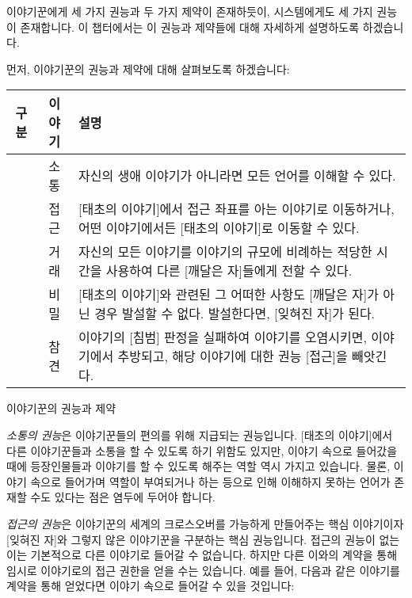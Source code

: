 \documentclass{report}
\begin{document}
	이야기꾼에게 세 가지 권능과 두 가지 제약이 존재하듯이, 시스템에게도 세 가지 권능이 존재합니다. 이 챕터에서는 이 권능과 제약들에 대해 자세하게 설명하도록 하겠습니다.
	
	\bigskip
	
	먼저, 이야기꾼의 권능과 제약에 대해 살펴보도록 하겠습니다:
	
	\smallskip
	
	\begin{minipage}{\textwidth}
		\begin{tabularx}{\textwidth}{c|c|X}
			\hline
			\textbf{구분} & \textbf{이야기} & \textbf{설명} \\ \hline \hline
			[권능] & 소통\index{소통} & 자신의 생애 이야기가 아니라면 모든 언어를 이해할 수 있다. \\ \hline
			[권능] & 접근\index{접근} & [태초의 이야기]에서 접근 좌표를 아는 이야기로 이동하거나, 어떤 이야기에서든 [태초의 이야기]로 이동할 수 있다. \\ \hline
			[권능] & 거래\index{거래} & 자신의 모든 이야기를 이야기의 규모에 비례하는 적당한 시간을 사용하여 다른 [깨달은 자]들에게 전할 수 있다. \\ \hline
			[제약] & 비밀\index{비밀} & [태초의 이야기]와 관련된 그 어떠한 사항도 [깨달은 자]가 아닌 경우 발설할 수 없다. 발설한다면, [잊혀진 자]가 된다. \\ \hline
			[제약] & 참견\index{참견} & 이야기의 [침범] 판정을 실패하여 이야기를 오염시키면, 이야기에서 추방되고, 해당 이야기에 대한 권능 [접근]을 빼앗긴다. \\\hline
		\end{tabularx}
		\begin{center}
			이야기꾼의 권능과 제약
		\end{center}
	\end{minipage}
	
	\bigskip
	
	\emph{소통의 권능}은 이야기꾼들의 편의를 위해 지급되는 권능입니다. [태초의 이야기]에서 다른 이야기꾼들과 소통을 할 수 있도록 하기 위함도 있지만, 이야기 속으로 들어갔을 때에 등장인물들과 이야기를 할 수 있도록 해주는 역할 역시 가지고 있습니다. 물론, 이야기 속으로 들어가며 역할이 부여되거나 하는 등으로 인해 이해하지 못하는 언어가 존재할 수도 있다는 점은 염두에 두어야 합니다.
	
	\smallskip
	
	\emph{접근의 권능}은 이야기꾼의 세계의 크로스오버를 가능하게 만들어주는 핵심 이야기이자 [잊혀진 자]와 그렇지 않은 이야기꾼을 구분하는 핵심 권능입니다. 접근의 권능이 없는 이는 기본적으로 다른 이야기로 들어갈 수 없습니다. 하지만 다른 이와의 계약을 통해 임시로 이야기로의 접근 권한을 얻을 수는 있습니다. 예를 들어, 다음과 같은 이야기를 계약을 통해 얻었다면 이야기 속으로 들어갈 수 있을 것입니다:
	
\end{document}
